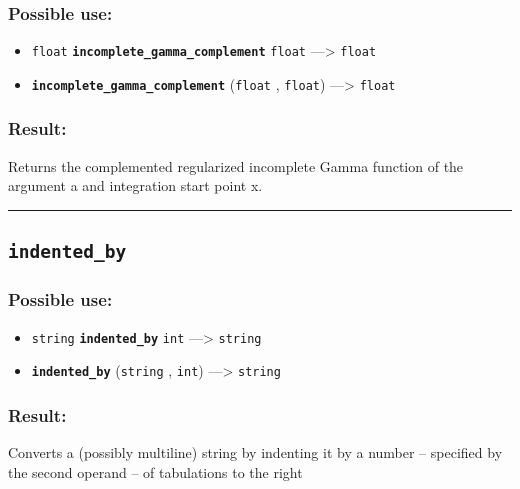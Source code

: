 \documentclass[]{book}
\providecommand{\tightlist}{%
  \setlength{\itemsep}{0pt}\setlength{\parskip}{0pt}}
\theoremstyle{definition}
\theoremstyle{definition}
\theoremstyle{definition}
\theoremstyle{remark}
\begin{document}
\subsubsection{Possible use:}\label{possible-use-271}

\begin{itemize}
\tightlist
\item
  \texttt{float} \textbf{\texttt{incomplete\_gamma\_complement}}
  \texttt{float} ---\textgreater{} \texttt{float}
\item
  \textbf{\texttt{incomplete\_gamma\_complement}} (\texttt{float} ,
  \texttt{float}) ---\textgreater{} \texttt{float}
\end{itemize}

\subsubsection{Result:}\label{result-261}

Returns the complemented regularized incomplete Gamma function of the
argument a and integration start point x.

\begin{center}\rule{0.5\linewidth}{\linethickness}\end{center}

\subsection{\texorpdfstring{\texttt{indented\_by}}{indented\_by}}\label{indented_by}

\subsubsection{Possible use:}\label{possible-use-272}

\begin{itemize}
\tightlist
\item
  \texttt{string} \textbf{\texttt{indented\_by}} \texttt{int}
  ---\textgreater{} \texttt{string}
\item
  \textbf{\texttt{indented\_by}} (\texttt{string} , \texttt{int})
  ---\textgreater{} \texttt{string}
\end{itemize}

\subsubsection{Result:}\label{result-262}

Converts a (possibly multiline) string by indenting it by a number --
specified by the second operand -- of tabulations to the right
\end{document}
